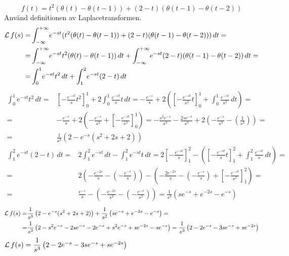 \begin{task}{3.16}
	\[f(t)= t^2(\theta(t)-\theta(t-1))+(2-t)(\theta(t-1)-\theta(t-2))\]
	Använd definitionen av Laplacetransformen.
	\begin{align*}
	\operatorname{\mathcal{L}} f(s)=
	&\int_{-\infty}^{+\infty}\! e^{-st}(t^2(\theta(t)-\theta(t-1))+(2-t)(\theta(t-1)-\theta(t-2)))\, dt= \\ =
	&\int_{-\infty}^{+\infty}\! e^{-st}t^2(\theta(t)-\theta(t-1))\, dt+\int_{-\infty}^{+\infty}\! e^{-st}(2-t)(\theta(t-1)-\theta(t-2))\, dt= \\ =
	&\int_{0}^{1}\! e^{-st}t^2\, dt+\int_{1}^{2}\! e^{-st}(2-t)\, dt
	\end{align*}
	\begin{align*}
	\int_{0}^{1}\! e^{-st}t^2\, dt=
	&\left[-\frac{e^{-st}}{s}t^2\right]_0^1+2\int_{0}^{1}\! \frac{e^{-st}}{s}t\, dt=
	-\frac{e^{-s}}{s}+2\left(\left[-\frac{e^{-st}}{s^2}t\right]_0^1+\int_{0}^{1}\! \frac{e^{-st}}{s^2}\, dt\right)= \\ =
	&-\frac{e^{-s}}{s}+2\left(-\frac{e^{-s}}{s^2}+\left[-\frac{e^{-st}}{s^3}\right]_0^1\right)=
	-\frac{s^2e^{-s}}{s^3}-\frac{2se^{-s}}{s^3}+2\left(-\frac{e^{-s}}{s^3}-\left(\frac{1}{s^3}\right)\right)= \\ =
	&\frac{1}{s^3}\left(2-e^{-s}(s^2+2s+2)\right)
	\end{align*}
	\begin{align*}
	\int_{1}^{2}\! e^{-st}(2-t)\, dt=
	&2\int_{1}^{2}\! e^{-st}\, dt-\int_{1}^{2}\! e^{-st}t\, dt=
	2\left[-\frac{e^{-st}}{s}\right]_1^2-\left(\left[-\frac{e^{-st}}{s}t\right]_1^2+\int_{1}^{2}\! \frac{e^{-st}}{s}\, dt\right)= \\ =
	&2\left(-\frac{e^{-2s}}{s}-\left(-\frac{e^{-s}}{s}\right)\right)-\left(-\frac{2e^{-2s}}{s}-\left(-\frac{e^{-s}}{s}\right)+\left[-\frac{e^{-st}}{s^2}\right]_1^2\right)= \\ =
	&\frac{e^{-s}}{s}-\left(-\frac{e^{-2s}}{s^2}-\left(-\frac{e^{-s}}{s^2}\right)\right)=
	\frac{1}{s^2}\left(se^{-s}+e^{-2s}-e^{-s}\right)
	\end{align*}
	\begin{align*}
	\operatorname{\mathcal{L}} f(s)=
	&\frac{1}{s^3}\left(2-e^{-s}(s^2+2s+2)\right)+\frac{1}{s^2}\left(se^{-s}+e^{-2s}-e^{-s}\right)= \\ =
	&\frac{1}{s^3}\left(2-s^2e^{-s}-2se^{-s}-2e^{-s}+s^2e^{-s}+se^{-2s}-se^{-s}\right)=
	\frac{1}{s^3}\left(2-2e^{-s}-3se^{-s}+se^{-2s}\right)
	\end{align*}
	\ans $\operatorname{\mathcal{L}} f(s)=\dfrac{1}{s^3}\left(2-2e^{-s}-3se^{-s}+se^{-2s}\right)$
\end{task}
